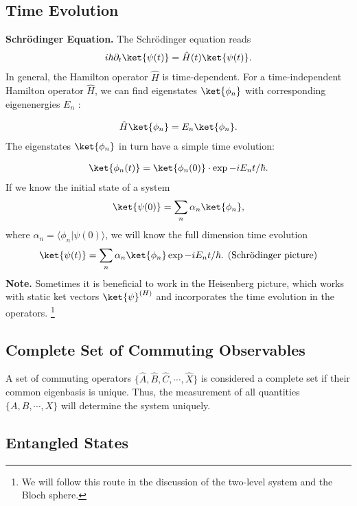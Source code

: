 \subsection{Time Evolution}

\textbf{Schrödinger Equation.} The Schrödinger equation reads
\begin{align}
i\hbar\partial_t\ket{\psi(t)}=\hat{H}(t)\ket{\psi(t)}.
\end{align}
In general, the Hamilton operator $\hat{H}$ is time-dependent. For a time-independent Hamilton operator $\hat{H}$, we can find eigenstates $\ket{\phi_n}$ with corresponding eigenenergies $E_n$ :

\begin{align}
\hat{H}\ket{\phi_n}=E_n\ket{\phi_n}.
\end{align}
The eigenstates $\ket{\phi_n}$ in turn have a simple time evolution:

\begin{align}
    \ket{\phi_n(t)}=\ket{\phi_n(0)}\cdot \exp{-i E_nt/\hbar}.
\end{align}
If we know the initial state of a system
\begin{align}
\ket{\psi(0)}=\sum_n \alpha_n\ket{\phi_n},
\end{align}
where $\alpha_n=\langle\phi_n | \psi(0)\rangle$, we will know the full dimension time evolution
\begin{align}
\ket{\psi(t)}=\sum_n\alpha_n\ket{\phi_n}\exp{-i E_n t/\hbar}. \;\, \text{(Schrödinger picture)}
\end{align}
\textbf{Note.} Sometimes it is beneficial to work in the Heisenberg picture, which works with static ket vectors $\ket{\psi}^{(H)}$ and incorporates the time evolution in the operators. \footnote{We will follow this route in the discussion of the two-level system and the Bloch sphere.}

\subsection{Complete Set of Commuting Observables}

A set of commuting operators $\{\hat{A},\hat{B},\hat{C},\cdots,\hat{X}\}$ is considered a complete set if their common eigenbasis is 				unique. Thus, the measurement of all quantities $\{A,B,\cdots,X\}$ will determine the system uniquely.

\subsection{Entangled States}
 

